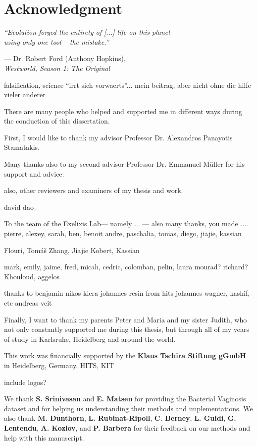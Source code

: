 \section*{Acknowledgment}
\vspace*{1em}

\epigraph
{\textit{``Evolution forged the entirety of [...] life on this planet \\ using only one tool -- the mistake.''}}
{--- Dr. Robert Ford (Anthony Hopkins),\\ \textit{Westworld, Season 1: The Original}}


falsification, science ``irrt sich vorwaerts''... mein beitrag, aber nicht ohne die hilfe vieler anderer


There are many people who helped and supported me in different ways during the conduction of this dissertation.

First, I would like to thank my advisor Professor Dr. Alexandros Panayotis Stamatakis,

Many thanks also to my second advisor Professor Dr. Emmanuel Müller for his support and advice.

also, other reviewers and examiners of my thesis and work.

david dao

To the team of the Exelixis Lab--- namely ... --- also many thanks, you made ....
pierre, alexey, sarah, ben, benoit
andre, paschalia, tomas, diego, jiajie, kassian

Flouri, Tom{\'{a}}{\v{s}}
Zhang, Jiajie
Kobert, Kassian

mark, emily, jaime, fred, micah, cedric, colomban, pelin, laura
mourad? richard? Khouloud, aggelos


thanks to benjamin nikos kiera johannes resin from hits
johannes wagner, kashif, etc
andreas veit


Finally, I want to thank my parents Peter and Maria and my sister Judith,
who not only constantly supported me during this thesis,
but through all of my years of study in Karlsruhe, Heidelberg and around the world.


This work was financially supported by the \textbf{Klaus Tschira Stiftung gGmbH} in Heidelberg, Germany.
HITS, KIT

include logos?

We thank \textbf{S. Srinivasan} and \textbf{E. Matsen}
for providing the Bacterial Vaginosis dataset \cite{Srinivasan2012}
and for helping us understanding their methods and implementations.
We also thank \textbf{M. Dunthorn}, \textbf{L. Rubinat-Ripoll}, \textbf{C. Berney}, \textbf{L. Guidi},
\textbf{G. Lentendu}, %
\textbf{A. Kozlov}, and \textbf{P. Barbera}
for their feedback on our methods and help with this manuscript.

